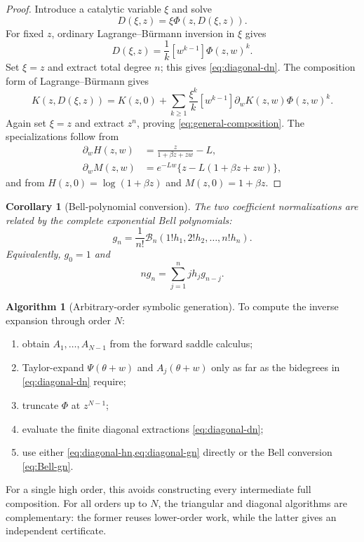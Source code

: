 \documentclass[11pt,oneside]{article}
\numberwithin{equation}{section}
\newtheorem{corollary}[theorem]{Corollary}
\theoremstyle{definition}
\newtheorem{algorithm}[theorem]{Algorithm}
\theoremstyle{remark}
\newcommand{\Bell}{\mathcal B}
\begin{document}
\begin{proof}
Introduce a catalytic variable $\xi$ and solve
\begin{equation}
 D(\xi,z)=\xi\Phi(z,D(\xi,z)).
 \label{eq:catalytic}
\end{equation}
For fixed $z$, ordinary Lagrange--B\"urmann inversion in $\xi$ gives
\begin{equation}
 [\xi^k]D(\xi,z)=\frac1k[w^{k-1}]\Phi(z,w)^k.
 \label{eq:LB-D}
\end{equation}
Set $\xi=z$ and extract total degree $n$; this gives
\cref{eq:diagonal-dn}.  The composition form of Lagrange--B\"urmann gives
\begin{equation}
 K(z,D(\xi,z))=K(z,0)+
 \sum_{k\ge1}\frac{\xi^k}{k}[w^{k-1}]
 \partial_wK(z,w)\Phi(z,w)^k.
 \label{eq:LB-composition}
\end{equation}
Again set $\xi=z$ and extract $z^n$, proving
\cref{eq:general-composition}.  The specializations follow from
\begin{align}
 \partial_wH(z,w)&=\frac z{1+\beta z+zw}-L,\\
 \partial_wM(z,w)&=e^{-Lw}\{z-L(1+\beta z+zw)\},
\end{align}
and from $H(z,0)=\log(1+\beta z)$ and $M(z,0)=1+\beta z$.
\end{proof}

\begin{corollary}[Bell-polynomial conversion]
\label{cor:Bell-conversion}
The two coefficient normalizations are related by the complete exponential Bell polynomials:
\begin{equation}
 \boxed{
 g_n=\frac1{n!}\Bell_n(1!h_1,2!h_2,\ldots,n!h_n).}
 \label{eq:Bell-gn}
\end{equation}
Equivalently, $g_0=1$ and
\begin{equation}
 ng_n=\sum_{j=1}^{n}j h_jg_{n-j}.
 \label{eq:Bell-recursive}
\end{equation}
\end{corollary}

\begin{algorithm}[Arbitrary-order symbolic generation]
\label{alg:generation}
To compute the inverse expansion through order $N$:
\begin{enumerate}
\item obtain $A_1,\ldots,A_{N-1}$ from the forward saddle calculus;
\item Taylor-expand $\Psi(\theta+w)$ and $A_j(\theta+w)$ only as far as the bidegrees in \cref{eq:diagonal-dn} require;
\item truncate $\Phi$ at $z^{N-1}$;
\item evaluate the finite diagonal extractions \cref{eq:diagonal-dn};
\item use either \cref{eq:diagonal-hn,eq:diagonal-gn} directly or the Bell conversion \cref{eq:Bell-gn}.
\end{enumerate}
For a single high order, this avoids constructing every intermediate full composition.  For all orders up to $N$, the triangular and diagonal algorithms are complementary: the former reuses lower-order work, while the latter gives an independent certificate.
\end{algorithm}
\end{document}
